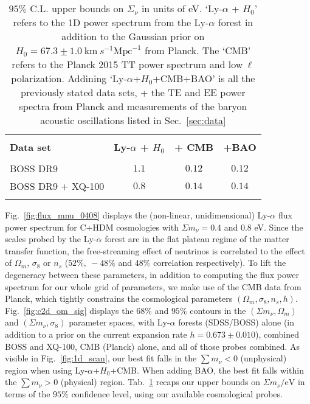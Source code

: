 \begin{table}
\begin{center}
\begin{tabular}{lccc}
\hline \\[-10pt]
\textbf{Data set} & \textbf{Ly-$\alpha$ + $H_0$} & \textbf{+ CMB} & \textbf{+BAO} \\[2pt]
\hline \\[-10pt]
BOSS DR9 & $1.1$ & $0.12$ & $0.12$ \\[2pt]
BOSS DR9 + XQ-100 & $0.8$ & $0.14$ & $0.14$ \\[2pt]
\hline \\[-10pt]
\end{tabular}
\end{center}
\caption{$95\%$ C.L. upper bounds on $\Sigma_\nu$ in units of eV. `Ly-$\alpha$ + $H_0$' refers to the 1D power spectrum from the Ly-$\alpha$ forest in addition to the Gaussian prior on $H_0 = 67.3 \pm 1.0~\mathrm{km}~s^{-1}\mathrm{Mpc}^{-1}$ from Planck. The `CMB' refers to the Planck 2015 TT power spectrum and low$~\ell$ polarization. Addining `Ly-$\alpha$+$H_0$+CMB+BAO' is all the previously stated data sets, + the TE and EE power spectra from Planck and measurements of the baryon acoustic oscillations listed in Sec.~\ref{sec:data}}
\label{tab:Mnu_limits}
\end{table}



Fig.~\ref{fig:flux_mnu_0408} displays the (non-linear, unidimensional) Ly-$\alpha$ flux power spectrum for C+HDM cosmologies with $\Sigma m_\nu = 0.4$ and $0.8$ eV. Since the scales probed by the Ly-$\alpha$ forest are in the flat plateau regime of the matter transfer function, the free-streaming effect of neutrinos is correlated to the effect of $\Omega_m$, $\sigma_8$ or $n_s$ ($52 \%,~-48\%$ and $48\%$ correlation respectively). To lift the degeneracy between these parameters, in addition to computing the flux power spectrum for our whole grid of parameters, we make use of the CMB data from Planck, which tightly constrains the cosmological parameters $\left( \Omega_m, \sigma_8, n_s, h \right)$. Fig.~\ref{fig:c2d_om_sig} displays the $68\%$ and $95\%$ contours in the $\left( \Sigma m_\nu, \Omega_m \right)$ and $\left( \Sigma m_\nu, \sigma_8 \right)$ parameter spaces, with Ly-$\alpha$ forests (SDSS/BOSS) alone (in addition to a prior on the current expansion rate $h = 0.673 \pm 0.010$), combined BOSS and XQ-100, CMB (Planck) alone, and all of those probes combined. As visible in Fig.~\ref{fig:1d_scan}, our best fit falls in the $\sum m_\nu < 0$ (unphysical) region when using Ly-$\alpha$+$H_0$+CMB. When adding BAO, the best fit falls within the $\sum m_\nu > 0$ (physical) region. 
Tab.~\ref{tab:Mnu_limits} recaps our upper bounds on $\Sigma m_\nu / \mathrm{eV}$ in terms of the $95\%$ confidence level, using our available cosmological probes.


